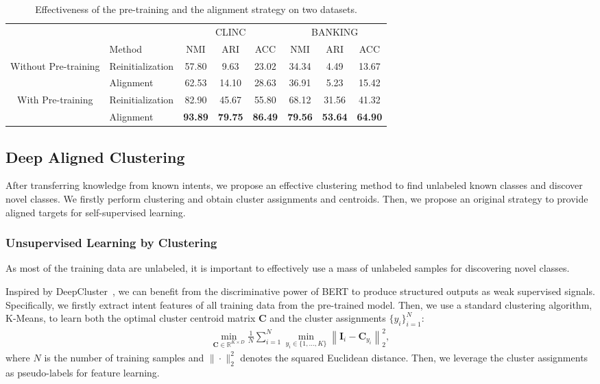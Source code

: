 \documentclass[letterpaper]{article} \usepackage{aaai21}  \usepackage{times}  \usepackage{helvet} \usepackage{courier}  \usepackage[hyphens]{url}  \usepackage{graphicx} \urlstyle{rm} \def\UrlFont{\rm}  \usepackage{natbib}  \usepackage{caption} \frenchspacing  \setlength{\pdfpagewidth}{8.5in}  \setlength{\pdfpageheight}{11in}  \usepackage{amsmath}
\begin{document}
	\begin{table*}[t!]\small
		\centering
		\begin{tabular}{@{\extracolsep{4pt}}clcccccc}
			\toprule
			\centering
			&  & \multicolumn{3}{c}{CLINC} & \multicolumn{3}{c}{BANKING}\\
			\addlinespace[0.1cm] \cline{3-5} \cline{6-8} \addlinespace[0.1cm]
			& Method & NMI & ARI & ACC & NMI & ARI & ACC \\
			\midrule
			\multirow{2}{*}{Without Pre-training} 
			& Reinitialization  & 57.80 & 9.63 & 23.02 & 34.34 & 4.49 & 13.67\\
			& Alignment & 62.53 & 14.10 & 28.63 & 36.91 & 5.23 & 15.42\\
			\midrule
			\multirow{2}{*}{With Pre-training} 
			& Reinitialization  & 82.90 & 45.67 & 55.80 & 68.12 & 31.56 & 41.32\\
			& Alignment  & \textbf{93.89} & \textbf{79.75} & \textbf{86.49} & \textbf{79.56} & \textbf{53.64} & \textbf{64.90}\\
			\bottomrule
		\end{tabular}
		\caption{ \label{results-aba-1}  
			Effectiveness of the pre-training  and the alignment strategy on two datasets. 
		}
	\end{table*}
	
	\subsection{Deep Aligned Clustering}
	After transferring knowledge from known intents, we propose an effective clustering method to find unlabeled known classes and discover novel classes. We firstly perform clustering and obtain cluster assignments and centroids. Then, we propose an original strategy to provide aligned targets for self-supervised learning.
	
	\subsubsection{Unsupervised Learning by Clustering}
	As most of the training data are unlabeled, it is important to effectively use a mass of unlabeled samples for discovering novel classes.
	
	Inspired by DeepCluster~\cite{caron2018deep}, we can benefit from the discriminative power of BERT to produce structured outputs as weak supervised signals. Specifically, we firstly extract intent features of all training data from the pre-trained model. Then, we use a standard clustering algorithm, K-Means, to learn both the optimal cluster centroid matrix $\boldsymbol{C}$ and the cluster assignments $\{y_{i}\}_{i=1}^{N}$:
	\begin{align}
		\min _{\boldsymbol{C}\in \mathds R^{K \times D}}\frac{1}{N}\sum_{i=1}^{N}\min _{y_{i}\in\{1, \ldots, K\}}\left\|\boldsymbol{I}_i-\boldsymbol{C}_{y_{i}}\right\|_{2}^{2},
		\label{k-means}
	\end{align}
	where $N$ is the number of training samples and  $\|\cdot\|_{2}^{2}$ denotes the squared Euclidean distance. Then, we leverage the cluster assignments as pseudo-labels for feature learning. 
	
\end{document}
